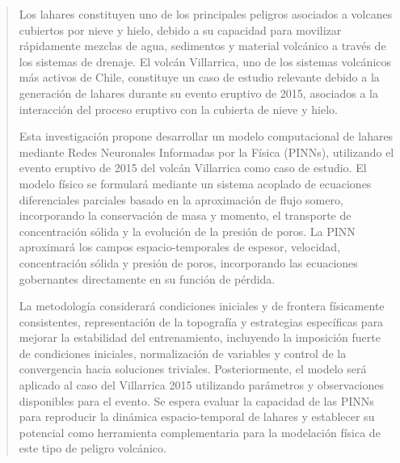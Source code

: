 %
\begin{abstract}%
    Los lahares constituyen uno de los principales peligros asociados a volcanes cubiertos por nieve y hielo, debido a su capacidad para movilizar rápidamente mezclas de agua, sedimentos y material volcánico a través de los 
    sistemas de drenaje. El volcán Villarrica, uno de los sistemas volcánicos más activos de Chile, constituye un caso de estudio relevante debido a la generación de lahares durante su evento eruptivo de 2015, asociados a la 
    interacción del proceso eruptivo con la cubierta de nieve y hielo.

    Esta investigación propone desarrollar un modelo computacional de lahares mediante Redes Neuronales Informadas por la Física (PINNs), utilizando el evento eruptivo de 2015 del volcán Villarrica como caso de estudio. 
    El modelo físico se formulará mediante un sistema acoplado de ecuaciones diferenciales parciales basado en la aproximación de flujo somero, incorporando la conservación de masa y momento, el transporte de concentración 
    sólida y la evolución de la presión de poros. La PINN aproximará los campos espacio-temporales de espesor, velocidad, concentración sólida y presión de poros, incorporando las ecuaciones gobernantes directamente en su 
    función de pérdida.

    La metodología considerará condiciones iniciales y de frontera físicamente consistentes, representación de la topografía y estrategias específicas para mejorar la estabilidad del entrenamiento, incluyendo la imposición 
    fuerte de condiciones iniciales, normalización de variables y control de la convergencia hacia soluciones triviales. Posteriormente, el modelo será aplicado al caso del Villarrica 2015 utilizando parámetros y observaciones 
    disponibles para el evento. Se espera evaluar la capacidad de las PINNs para reproducir la dinámica espacio-temporal de lahares y establecer su potencial como herramienta complementaria para la modelación 
    física de este tipo de peligro volcánico.
    

\end{abstract}

